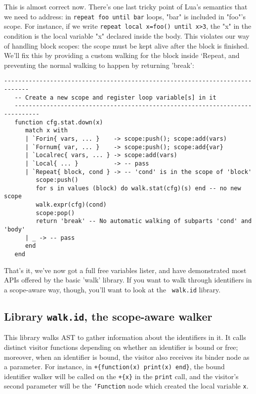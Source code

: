 This is almost correct now. There's one last tricky point of Lua's semantics
that we need to address: in {\tt repeat foo until bar} loops, "bar" is included
in "foo"'s scope. For instance, if we write {\tt repeat local x=foo() until
  x>3}, the "x" in the condition is the local variable "x" declared inside the
body. This violates our way of handling block scopes: the scope must be kept
alive after the block is finished. We'll fix this by providing a custom walking
for the block inside `Repeat, and preventing the normal walking to happen by
returning 'break':

\begin{Verbatim}[fontsize=\scriptsize]
   -----------------------------------------------------------------------------
   -- Create a new scope and register loop variable[s] in it
   -----------------------------------------------------------------------------
   function cfg.stat.down(x)
      match x with
      | `Forin{ vars, ... }    -> scope:push(); scope:add(vars)
      | `Fornum{ var, ... }    -> scope:push(); scope:add{var}
      | `Localrec{ vars, ... } -> scope:add(vars)
      | `Local{ ... }          -> -- pass
      | `Repeat{ block, cond } -> -- 'cond' is in the scope of 'block'
         scope:push()
         for s in values (block) do walk.stat(cfg)(s) end -- no new scope
         walk.expr(cfg)(cond)
         scope:pop()
         return 'break' -- No automatic walking of subparts 'cond' and 'body'
      | _ -> -- pass
      end
   end
\end{Verbatim}

That's it, we've now got a full free variables lister, and have demonstrated
most APIs offered by the basic 'walk' library. If you want to walk through
identifiers in a scope-aware way, though, you'll want to look at the {\tt
  walk.id} library.

\subsection{Library {\tt walk.id}, the scope-aware walker}

This library walks AST to gather information about the identifiers in it. It
calls distinct visitor functions depending on whether an identifier is bound or
free; moreover, when an identifier is bound, the visitor also receives its
binder node as a parameter. For instance, in {\tt +\{function(x) print(x)
  end\}}, the bound identifier walker will be called on the \verb|+{x}| in the
\verb|print| call, and the visitor's second parameter will be the {\tt`Function}
node which created the local variable {\tt x}.

